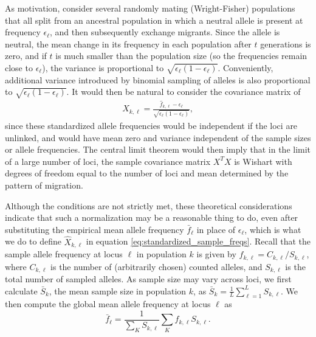 \documentclass[12pt]{article}
\begin{document}
As motivation, consider several randomly mating (Wright-Fisher) populations
that all split from an ancestral population
in which a neutral allele is present at frequency $\epsilon_\ell$,
and then subsequently exchange migrants.
Since the allele is neutral, the mean change in its frequency in each population after $t$ generations is zero,
and if $t$ is much smaller than the population size (so the frequencies remain close to $\epsilon_\ell$), 
the variance is proportional to $\sqrt{\epsilon_\ell (1-\epsilon_\ell)}$.
Conveniently, additional variance introduced by binomial sampling of alleles
is also proportional to $\sqrt{\epsilon_\ell (1-\epsilon_\ell)}$.
It would then be natural to consider the covariance matrix of 
\begin{align}
  X_{k,\ell} = \frac{ \hat f_{k,\ell} - \epsilon_\ell }{ \sqrt{ \epsilon_\ell (1- \epsilon_\ell) } } ,
\end{align}
since these standardized allele frequencies would be independent if the loci are unlinked,
and would have mean zero and variance independent of the sample sizes or allele frequencies.
The central limit theorem would then imply that in the limit of a large number of loci, 
the sample covariance matrix $X^T X$ is Wishart with degrees of freedom equal to the number of loci
and mean determined by the pattern of migration.

Although the conditions are not strictly met, 
these theoretical considerations indicate that such a normalization may be a reasonable thing to do,
even after substituting the empirical mean allele frequency $\bar f_\ell$ in place of $\epsilon_\ell$,
which is what we do to define $\hat X_{k,\ell}$ in equation \eqref{eq:standardized_sample_freqs}.
Recall that the sample allele frequency at locus $\ell$ in population $k$ is given by $\hat{f}_{k,\ell} = C_{k,\ell}/S_{k,\ell}$,  
where $C_{k,\ell}$ is the number of (arbitrarily chosen) counted alleles,
and $S_{k,\ell}$ is the total number of sampled alleles.
As sample size may vary across loci, we first calculate $\bar{S}_k$, 
the mean sample size in population $k$, 
as $\bar{S}_k = \frac{1}{L}\sum_{\ell=1}^L S_{k,\ell}$.  
We then compute the global mean allele frequency at locus $\ell$ as
\begin{equation}
\label{eq:sample_mean_freq}
\bar{f}_{\ell} = \frac{1}{\sum_K S_{k,\ell}} \sum_K \hat{f}_{k,\ell} S_{k,\ell} .
\end{equation}
\end{document}
